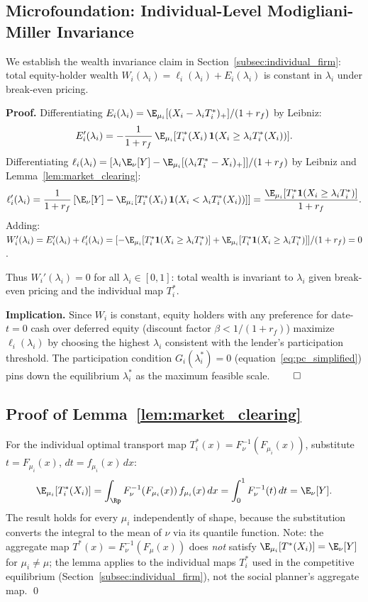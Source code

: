 \subsection*{Microfoundation: Individual-Level Modigliani-Miller Invariance}

We establish the wealth invariance claim in Section~\ref{subsec:individual_firm}: total equity-holder wealth $W_i(\lambda_i) = \ell_i(\lambda_i) + E_i(\lambda_i)$ is constant in $\lambda_i$ under break-even pricing.

\textbf{Proof.} Differentiating $E_i(\lambda_i) = \E_{\mu_i}[(X_i - \lambda_i T_i^*)_+]/(1+r_f)$ by Leibniz:
\[
  E_i'(\lambda_i) = -\frac{1}{1+r_f}\,\E_{\mu_i}[T_i^*(X_i)\,\mathbf{1}(X_i \geq \lambda_i T_i^*(X_i))].
\]
Differentiating $\ell_i(\lambda_i) = [\lambda_i \E_\nu[Y] - \E_{\mu_i}[(\lambda_i T_i^*-X_i)_+]]/(1+r_f)$ by Leibniz and Lemma~\ref{lem:market_clearing}:
\[
  \ell_i'(\lambda_i) = \frac{1}{1+r_f}\left[\E_\nu[Y] - \E_{\mu_i}[T_i^*(X_i)\,\mathbf{1}(X_i < \lambda_i T_i^*(X_i))]\right] = \frac{\E_{\mu_i}[T_i^*\mathbf{1}(X_i \geq \lambda_i T_i^*)]}{1+r_f}.
\]
Adding: $W_i'(\lambda_i) = E_i'(\lambda_i) + \ell_i'(\lambda_i) = [-\E_{\mu_i}[T_i^*\mathbf{1}(X_i \geq \lambda_i T_i^*)] + \E_{\mu_i}[T_i^*\mathbf{1}(X_i \geq \lambda_i T_i^*)]]/(1+r_f) = 0$.

Thus $W_i'(\lambda_i) = 0$ for all $\lambda_i \in [0,1]$: total wealth is invariant to $\lambda_i$ given break-even pricing and the individual map $T_i^*$.

\textbf{Implication.} Since $W_i$ is constant, equity holders with any preference for date-$t=0$ cash over deferred equity (discount factor $\beta < 1/(1+r_f)$) maximize $\ell_i(\lambda_i)$ by choosing the highest $\lambda_i$ consistent with the lender's participation threshold. The participation condition $G_i(\lambda_i^*) = 0$ (equation~\eqref{eq:pc_simplified}) pins down the equilibrium $\lambda_i^*$ as the maximum feasible scale. $\qed$

\subsection*{Proof of Lemma~\ref{lem:market_clearing}}

For the individual optimal transport map $T_i^*(x) = F_\nu^{-1}(F_{\mu_i}(x))$, substitute $t = F_{\mu_i}(x)$, $dt = f_{\mu_i}(x)\,dx$:
\[
  \E_{\mu_i}[T_i^*(X_i)] = \int_{\Rp} F_\nu^{-1}(F_{\mu_i}(x))\,f_{\mu_i}(x)\,dx = \int_0^1 F_\nu^{-1}(t)\,dt = \E_\nu[Y].
\]
The result holds for every $\mu_i$ independently of shape, because the substitution converts the integral to the mean of $\nu$ via its quantile function. Note: the aggregate map $T^*(x) = F_\nu^{-1}(F_\mu(x))$ does \emph{not} satisfy $\E_{\mu_i}[T^*(X_i)] = \E_\nu[Y]$ for $\mu_i \neq \mu$; the lemma applies to the individual maps $T_i^*$ used in the competitive equilibrium (Section~\ref{subsec:individual_firm}), not the social planner's aggregate map. \qed

